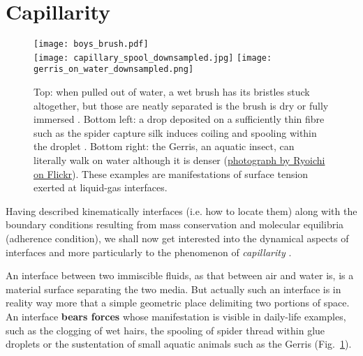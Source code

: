 \section{Capillarity}
\begin{figure}[htbp]
\begin{center}
\texttt{[image: boys\_brush.pdf]}\\
\texttt{[image: capillary\_spool\_downsampled.jpg]} \quad
\texttt{[image: gerris\_on\_water\_downsampled.png]}
\end{center}
\caption{Top: when pulled out of water, a wet brush has its bristles stuck altogether, but those are neatly separated is the brush is dry or fully immersed \citep{Boys1890}. Bottom left: a drop deposited on a sufficiently thin fibre such as the spider capture silk induces coiling and spooling within the droplet \citep{Elettro2016}. Bottom right: the Gerris, an aquatic insect, can literally walk on water although it is denser (\href{https://www.flickr.com/photos/ryoichi360/5847533955/in/photolist-9UJ97X-EU3vy-V3eJzF-8wimyD-fafpgs-HKfkdJ-22TUHgL-SWUure-dcK4vX-2baXF3n-DhVeuP-rMc5KH-253wqN-2fQ2VWT-8p2CBK-8d9rrm-VmimZt-PcW89C-283Sj59-Hvg77b-N9Ytvw-SN5EhR-cQ7gBj-s4aR9q-eDcCJz-HrEa1e-6hizYZ-Wq8cWg-FYhg7k-8874aQ-iJqVV-56yPYc-X5ffoi-pkU5Zt-p9ztvz-ZSJkzJ-ofYXjT-a9n3xT-2ekD2e9-5sAmFu-ccGJis-24KoY9K-QZW2Li-4f9Fjc-fyuZPT-Hr29p5-kLdZ8n-Tu8m9W-nQg4Lr-s85mcc}{photograph by Ryoichi on Flickr}). These examples are manifestations of surface tension exerted at liquid-gas interfaces.}
\label{fig:surface_tension}
\end{figure}
Having described kinematically interfaces (i.e. how to locate them) along with the boundary conditions resulting from mass conservation and molecular equilibria (adherence condition), we shall now get interested into the dynamical aspects of interfaces and more particularly to the phenomenon of \textit{capillarity} \citep{de-Gennes2015}.

An interface between two immiscible fluids, as that between air and water is, is a material surface separating the two media. But actually such an interface is in reality way more that a simple geometric place delimiting two portions of space. An interface \textbf{bears forces} whose manifestation is visible in daily-life examples, such as the clogging of wet hairs, the spooling of spider thread within glue droplets or the sustentation of small aquatic animals such as the Gerris (Fig.~\ref{fig:surface_tension}).


